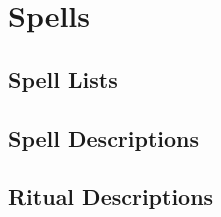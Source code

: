 \chapter{Spells}\label{Spells}

\section{Spell Lists}



\section{Spell Descriptions}



\section{Ritual Descriptions}


